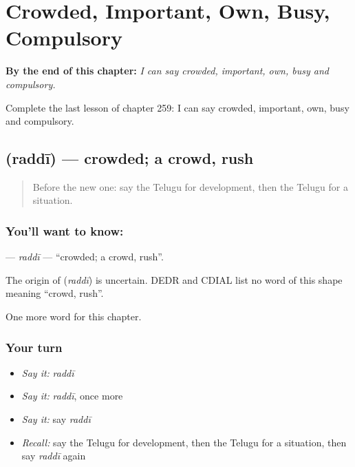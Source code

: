 
\chapter{Crowded, Important, Own, Busy, Compulsory}
\label{ch:te-crowded-important-own-busy-compulsory}

\begin{chapteropening}
\textbf{By the end of this chapter:} \emph{I can say crowded, important, own, busy and compulsory.}

Complete the last lesson of chapter 259: I can say crowded, important, own, busy and compulsory.
\end{chapteropening}

\section[\texorpdfstring{\te{రద్దీ} (raddī)}{రద్దీ (raddī)}]{ (raddī) — crowded; a crowd, rush}

\label{lesson:TE-C259-raddi}



\begin{quote}
Before the new one: say the Telugu for development, then the Telugu for a situation.
\end{quote}

\subsection*{You'll want to know: }
\textbf{} — \emph{raddī} — \textquotedblleft{}crowded; a crowd, rush\textquotedblright{}.

\begin{cousinweb}
The origin of \textbf{} (\emph{raddī}) is uncertain. DEDR and CDIAL list no word of this shape meaning \textquotedblleft{}crowd, rush\textquotedblright{}.
\end{cousinweb}

\begin{grammarlens}[title={What you've built}]
One more word for this chapter.
\end{grammarlens}

\subsection*{Your turn}
\begin{itemize}
\raggedright
  \item \emph{Say it:} \emph{raddī}
  \item \emph{Say it:} \emph{raddī}, once more
  \item \emph{Say it:} say \emph{raddī}
  \item \emph{Recall:} say the Telugu for development, then the Telugu for a situation, then say \emph{raddī} again
\end{itemize}

